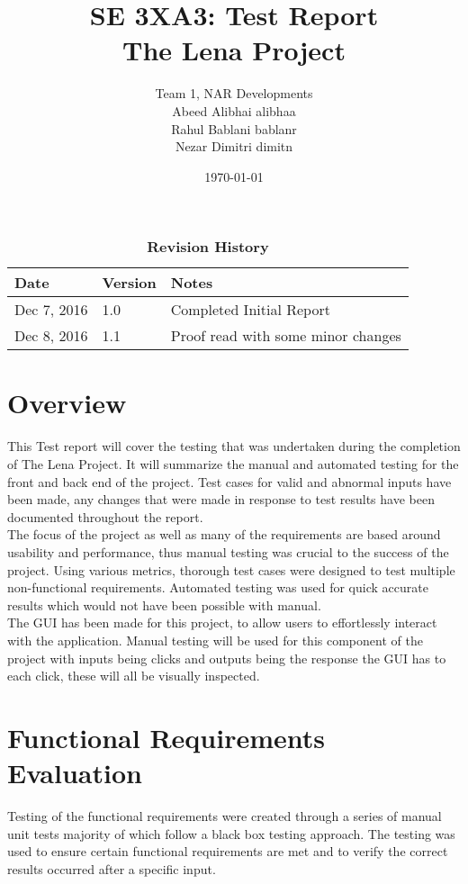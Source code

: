 \documentclass[12pt, titlepage]{article}
\title{SE 3XA3: Test Report\\The Lena Project}
\author{Team 1, NAR Developments
		\\ Abeed Alibhai alibhaa
		\\ Rahul Bablani bablanr
		\\ Nezar Dimitri dimitn
}
\date{\today}
\begin{document}
\maketitle
{}
\tableofcontents
\listoftables
\listoffigures
\begin{table}[bp]
\caption{\bf Revision History}
\begin{tabularx}{\textwidth}{p{3cm}p{2cm}X}
\toprule {\bf Date} & {\bf Version} & {\bf Notes}\\
\midrule
Dec 7, 2016 & 1.0 & Completed Initial Report\\
Dec 8, 2016 & 1.1 & Proof read with some minor changes\\
\bottomrule
\end{tabularx}
\end{table}
\newpage
{}
\section{Overview}

This Test report will cover the testing that was undertaken during the completion of The Lena Project. It will summarize the manual and automated testing for the front and back end of the project. Test cases for valid and abnormal inputs have been made, any changes that were made in response to test results have been documented throughout the report.\\

The focus of the project as well as many of the requirements are based around usability and performance, thus manual testing was crucial to the success of the project. Using various metrics, thorough test cases were designed to test multiple non-functional requirements. Automated testing was used for quick accurate results which would not have been possible with manual.\\
		
The GUI has been made for this project, to allow users to effortlessly interact with the application. Manual testing will be used for this component of the project with inputs being clicks and outputs being the response the GUI has to each click, these will all be visually inspected.

\section{Functional Requirements Evaluation}
Testing of the functional requirements were created through a series of manual unit tests majority of which follow a black box testing approach. The testing was used to ensure certain functional requirements are met and to verify the correct results occurred after a specific input.
\end{document}
